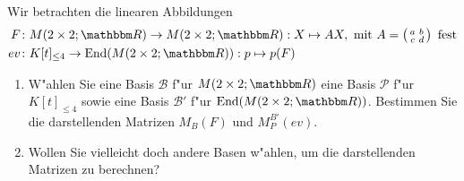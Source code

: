 \documentclass[a4,11pt]{article}
\DeclareMathOperator{\End}{End}
\begin{document}
\begin{aufgabe}
  Wir betrachten die linearen Abbildungen 
  \begin{align*}
  F &\colon M(2 \times 2; \R) \to M(2 \times 2; \R) : X \mapsto AX, \ \text{mit} \ 
  A =
  \left( \begin{smallmatrix}a&b\\c&d\end{smallmatrix}\right) \ \text{fest}\\
  ev &\colon K[t]_{\le 4} \to \End(M(2 \times 2; \R)) : p \mapsto
  p(F)
  \end{align*}
  
  \begin{enumerate}
  \item
    W"ahlen Sie eine Basis $\mathcal{B}$ f"ur $M(2 \times 2; \R)$
    eine Basis $\mathcal{P}$ f"ur $K[t]_{\leq 4}$ sowie eine Basis
    $\mathcal{B'}$ f"ur %
    $\End(M(2 \times 2; \R))$.
    Bestimmen Sie die darstellenden Matrizen $M_B(F)$ und $M_P^{B'}(ev)$.
  \item
    Wollen Sie vielleicht doch andere Basen w"ahlen, um die
    darstellenden Matrizen zu berechnen?
  \end{enumerate}
\end{aufgabe}
\end{document}
